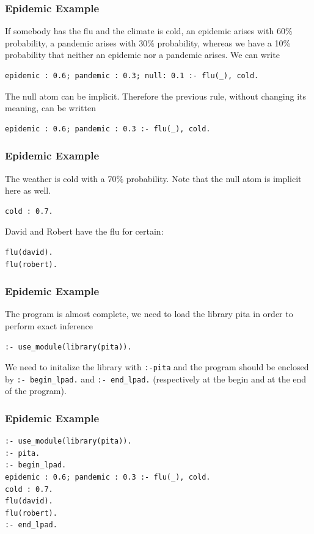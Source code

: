 \documentclass[trans]{beamer}
\begin{document}
\begin{frame}[fragile]
  \frametitle{Epidemic Example}

If somebody has the flu and the climate is cold, an epidemic arises with 60\% probability, a pandemic arises with 30\% probability, whereas we have a 10\% probability that neither an epidemic nor a pandemic arises. We can write
\begin{scriptsize}
\begin{verbatim}
epidemic : 0.6; pandemic : 0.3; null: 0.1 :- flu(_), cold.
\end{verbatim}
\end{scriptsize}
The null atom can be implicit. Therefore the previous rule, without changing its meaning, can be written
\begin{scriptsize}
\begin{verbatim}
epidemic : 0.6; pandemic : 0.3 :- flu(_), cold.
\end{verbatim}
\end{scriptsize}
\end{frame}

\begin{frame}[fragile]
  \frametitle{Epidemic Example}

The weather is cold with a 70\% probability. Note that the null atom is implicit here as well.
\begin{scriptsize}
\begin{verbatim}
cold : 0.7.
\end{verbatim}
\end{scriptsize}
David and Robert have the flu for certain:
\begin{scriptsize}
\begin{verbatim}
flu(david).
flu(robert).
\end{verbatim}
\end{scriptsize}
\end{frame}

\begin{frame}[fragile]
  \frametitle{Epidemic Example}
The program is almost complete,  we need  to load the library pita in order to perform exact inference
\begin{scriptsize}
\begin{verbatim}
:- use_module(library(pita)).
\end{verbatim}
\end{scriptsize}
We need to initalize the library with \verb|:-pita| and the program should be enclosed by \verb|:- begin_lpad.| and \verb|:- end_lpad.| (respectively at the begin and at the end of the program). 
\end{frame}
\begin{frame}[fragile]
  \frametitle{Epidemic Example}
\begin{verbatim}
:- use_module(library(pita)).
:- pita.
:- begin_lpad.
epidemic : 0.6; pandemic : 0.3 :- flu(_), cold.
cold : 0.7.
flu(david).
flu(robert).
:- end_lpad.
\end{verbatim}
\end{frame}
\end{document}
